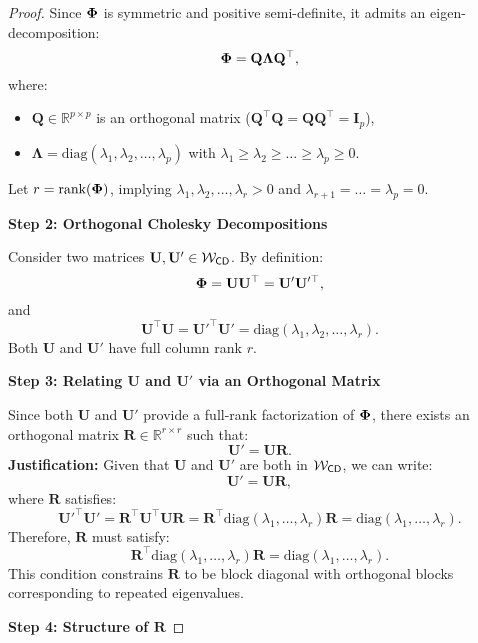 \iffalse
\begin{proof}
    Since \( \boldsymbol{\Phi} \) is symmetric and positive semi-definite, it admits an eigen-decomposition:
\[
    \boldsymbol{\Phi} = \mathbf{Q} \boldsymbol{\Lambda} \mathbf{Q}^\top,
\]
where:
\begin{itemize}
    \item \( \mathbf{Q} \in \mathbb{R}^{p \times p} \) is an orthogonal matrix (\( \mathbf{Q}^\top \mathbf{Q} = \mathbf{Q} \mathbf{Q}^\top = \mathbf{I}_p \)),
    \item \( \boldsymbol{\Lambda} = \text{diag}(\lambda_1, \lambda_2, \ldots, \lambda_p) \) with \( \lambda_1 \geq \lambda_2 \geq \ldots \geq \lambda_p \geq 0 \).
\end{itemize}
Let \( r = \text{rank}(\boldsymbol{\Phi}) \), implying \( \lambda_1, \lambda_2, \ldots, \lambda_r > 0 \) and \( \lambda_{r+1} = \ldots = \lambda_p = 0 \).

\textbf{Step 2: Orthogonal Cholesky Decompositions}

Consider two matrices \( \mathbf{U}, \mathbf{U}' \in {\mathcal{W}}_{\textsf{CD}} \). By definition:
\[
    \boldsymbol{\Phi} = \mathbf{U} \mathbf{U}^\top = \mathbf{U}' \mathbf{U}'^\top,
\]
and
\[    \mathbf{U}^\top \mathbf{U} = \mathbf{U}'^\top \mathbf{U}' = \text{diag}(\lambda_1, \lambda_2, \ldots, \lambda_r).\]
Both \( \mathbf{U} \) and \( \mathbf{U}' \) have full column rank \( r \).

\textbf{Step 3: Relating \( \mathbf{U} \) and \( \mathbf{U}' \) via an Orthogonal Matrix}

Since both \( \mathbf{U} \) and \( \mathbf{U}' \) provide a full-rank factorization of \( \boldsymbol{\Phi} \), there exists an orthogonal matrix \( \mathbf{R} \in \mathbb{R}^{r \times r} \) such that:
\[
    \mathbf{U}' = \mathbf{U} \mathbf{R}.
\]
\textbf{Justification:}
Given that \( \mathbf{U} \) and \( \mathbf{U}' \) are both in \( {\mathcal{W}}_{\textsf{CD}} \), we can write:
\[
    \mathbf{U}' = \mathbf{U} \mathbf{R},
\]
where \( \mathbf{R} \) satisfies:
\[
    \mathbf{U}'^\top \mathbf{U}' = \mathbf{R}^\top \mathbf{U}^\top \mathbf{U} \mathbf{R} = \mathbf{R}^\top \text{diag}(\lambda_1, \ldots, \lambda_r) \mathbf{R} = \text{diag}(\lambda_1, \ldots, \lambda_r).
\]
Therefore, \( \mathbf{R} \) must satisfy:
\[
    \mathbf{R}^\top \text{diag}(\lambda_1, \ldots, \lambda_r) \mathbf{R} = \text{diag}(\lambda_1, \ldots, \lambda_r).
\]
This condition constrains \( \mathbf{R} \) to be block diagonal with orthogonal blocks corresponding to repeated eigenvalues.

\textbf{Step 4: Structure of \( \mathbf{R} \)}


\end{proof}
